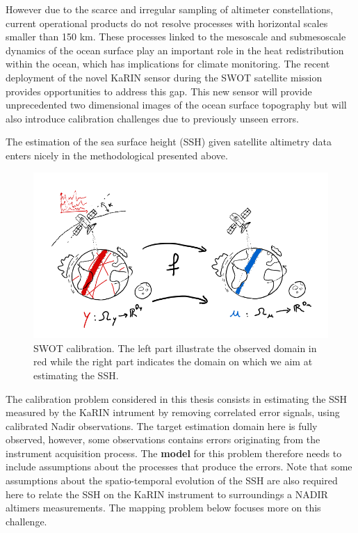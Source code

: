 \begin{bibunit}
However due to the scarce and irregular sampling of altimeter constellations, current operational products do not resolve processes with horizontal scales smaller than 150 km\cite{}.
These processes linked to the mesoscale and submesoscale dynamics of the ocean surface play an important role in the heat redistribution within the ocean, which has implications for climate monitoring.
The recent deployment of the novel KaRIN sensor during the SWOT satellite mission\cite{} provides opportunities to address this gap.
This new sensor will provide unprecedented two dimensional images of the ocean surface topography but will also introduce calibration challenges\cite{} due to previously unseen errors.

The estimation of the sea surface height (SSH) given satellite altimetry data enters nicely in the methodological presented above.

  \begin{figure}
      \centering
            \includegraphics[width=\linewidth]{Introduction/pics/calib_task.png}    
      \caption{SWOT calibration. The left part illustrate the observed domain in red while the right part indicates the domain on which we aim at estimating the SSH.}
      \label{fig:calibration_task}
  \end{figure}
The calibration problem considered in this thesis consists in estimating the SSH measured by the KaRIN intrument by removing  correlated error signals, using calibrated Nadir observations. The target estimation domain here is fully observed, however, some observations contains errors originating from the instrument acquisition process. The \textbf{model} for this problem therefore needs to include assumptions about the processes that produce the errors. Note that some assumptions about the spatio-temporal evolution of the SSH are also required here to relate the SSH on the KaRIN instrument to surroundings a NADIR altimers measurements. The mapping problem below focuses more on this challenge.


\end{bibunit}
